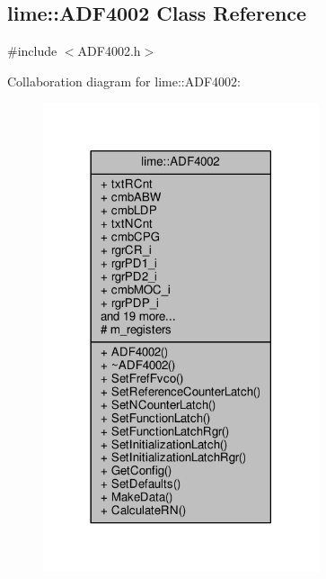 \subsection{lime\+:\+:A\+D\+F4002 Class Reference}
\label{classlime_1_1ADF4002}


{\ttfamily \#include $<$A\+D\+F4002.\+h$>$}



Collaboration diagram for lime\+:\+:A\+D\+F4002\+:
\nopagebreak
\begin{figure}[H]
\begin{center}
\leavevmode
\includegraphics[width=230pt]{dd/def/classlime_1_1ADF4002__coll__graph}
\end{center}
\end{figure}
